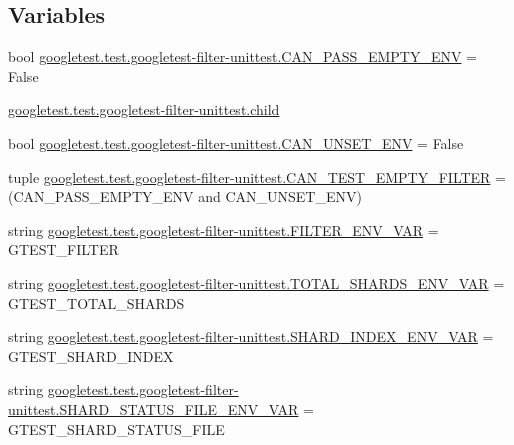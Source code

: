 \subsection*{Variables}
\begin{DoxyCompactItemize}
\item 
bool \mbox{\hyperlink{namespacegoogletest_1_1test_1_1googletest-filter-unittest_a42f52a10957138e1999d94faa5721690}{googletest.\+test.\+googletest-\/filter-\/unittest.\+C\+A\+N\+\_\+\+P\+A\+S\+S\+\_\+\+E\+M\+P\+T\+Y\+\_\+\+E\+NV}} = False
\item 
\mbox{\hyperlink{namespacegoogletest_1_1test_1_1googletest-filter-unittest_a78be278fabf3311afb39ebef6b605ff8}{googletest.\+test.\+googletest-\/filter-\/unittest.\+child}}
\item 
bool \mbox{\hyperlink{namespacegoogletest_1_1test_1_1googletest-filter-unittest_ae6b627c7f8c03f36686e1fc1831301c0}{googletest.\+test.\+googletest-\/filter-\/unittest.\+C\+A\+N\+\_\+\+U\+N\+S\+E\+T\+\_\+\+E\+NV}} = False
\item 
tuple \mbox{\hyperlink{namespacegoogletest_1_1test_1_1googletest-filter-unittest_abb728ff787755c0a5023eb92188b0da7}{googletest.\+test.\+googletest-\/filter-\/unittest.\+C\+A\+N\+\_\+\+T\+E\+S\+T\+\_\+\+E\+M\+P\+T\+Y\+\_\+\+F\+I\+L\+T\+ER}} = (C\+A\+N\+\_\+\+P\+A\+S\+S\+\_\+\+E\+M\+P\+T\+Y\+\_\+\+E\+NV and C\+A\+N\+\_\+\+U\+N\+S\+E\+T\+\_\+\+E\+NV)
\item 
string \mbox{\hyperlink{namespacegoogletest_1_1test_1_1googletest-filter-unittest_a916c8879cb8f57caceca3ebd44281d18}{googletest.\+test.\+googletest-\/filter-\/unittest.\+F\+I\+L\+T\+E\+R\+\_\+\+E\+N\+V\+\_\+\+V\+AR}} = \textquotesingle{}G\+T\+E\+S\+T\+\_\+\+F\+I\+L\+T\+ER\textquotesingle{}
\item 
string \mbox{\hyperlink{namespacegoogletest_1_1test_1_1googletest-filter-unittest_a31925a728f291c2c5ad10dba74a9089b}{googletest.\+test.\+googletest-\/filter-\/unittest.\+T\+O\+T\+A\+L\+\_\+\+S\+H\+A\+R\+D\+S\+\_\+\+E\+N\+V\+\_\+\+V\+AR}} = \textquotesingle{}G\+T\+E\+S\+T\+\_\+\+T\+O\+T\+A\+L\+\_\+\+S\+H\+A\+R\+DS\textquotesingle{}
\item 
string \mbox{\hyperlink{namespacegoogletest_1_1test_1_1googletest-filter-unittest_a9bd8152eb318316b4aa67cb40a5d8063}{googletest.\+test.\+googletest-\/filter-\/unittest.\+S\+H\+A\+R\+D\+\_\+\+I\+N\+D\+E\+X\+\_\+\+E\+N\+V\+\_\+\+V\+AR}} = \textquotesingle{}G\+T\+E\+S\+T\+\_\+\+S\+H\+A\+R\+D\+\_\+\+I\+N\+D\+EX\textquotesingle{}
\item 
string \mbox{\hyperlink{namespacegoogletest_1_1test_1_1googletest-filter-unittest_aba5602c2a676e9de5a4cdde3024e92c0}{googletest.\+test.\+googletest-\/filter-\/unittest.\+S\+H\+A\+R\+D\+\_\+\+S\+T\+A\+T\+U\+S\+\_\+\+F\+I\+L\+E\+\_\+\+E\+N\+V\+\_\+\+V\+AR}} = \textquotesingle{}G\+T\+E\+S\+T\+\_\+\+S\+H\+A\+R\+D\+\_\+\+S\+T\+A\+T\+U\+S\+\_\+\+F\+I\+LE\textquotesingle{}

\end{DoxyCompactItemize}
